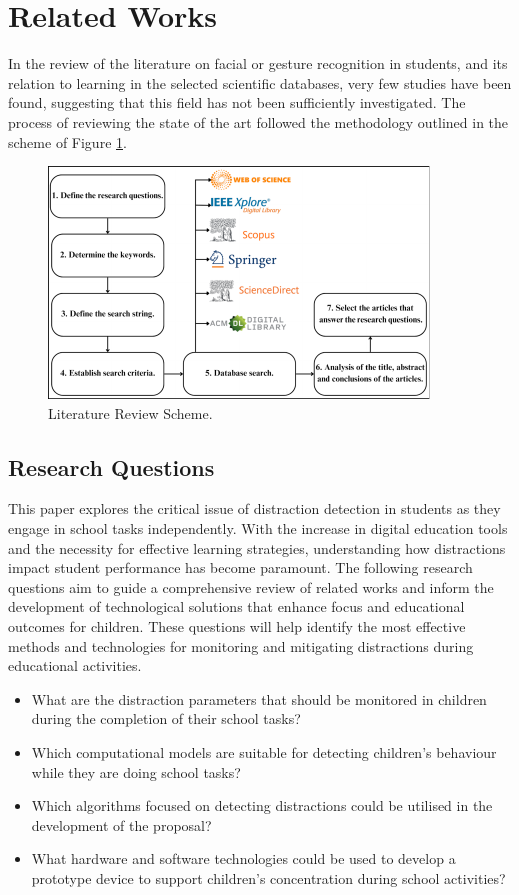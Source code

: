 \documentclass[a4paper,fleqn]{cas-sc}
\begin{document}
	\section{Related Works}
	\label{seccion:Dos}
		In the review of the literature on facial or gesture recognition in students, and its relation to learning in the selected scientific databases, very few studies have been found, suggesting that this field has not been sufficiently investigated. The process of reviewing the state of the art followed the methodology outlined in the scheme of Figure \ref{fig:LRS}.

		\begin{figure}[h]
			\includegraphics[width=\textwidth]{figs/Figure_1}
			\caption{Literature Review Scheme.}
			\label{fig:LRS}
		\end{figure}   

		\subsection{Research Questions}
			This paper explores the critical issue of distraction detection in students as they engage in school tasks independently. With the increase in digital education tools and the necessity for effective learning strategies, understanding how distractions impact student performance has become paramount. The following research questions aim to guide a comprehensive review of related works and inform the development of technological solutions that enhance focus and educational outcomes for children. These questions will help identify the most effective methods and technologies for monitoring and mitigating distractions during educational activities.
			
			\begin{itemize}
				\item What are the distraction parameters that should be monitored in children during the completion of their school tasks?
				\item Which computational models are suitable for detecting children's behaviour while they are doing school tasks?
				\item Which algorithms focused on detecting distractions could be utilised in the development of the proposal?
				\item What hardware and software technologies could be used to develop a prototype device to support children's concentration during school activities?
			\end{itemize}
\end{document}
